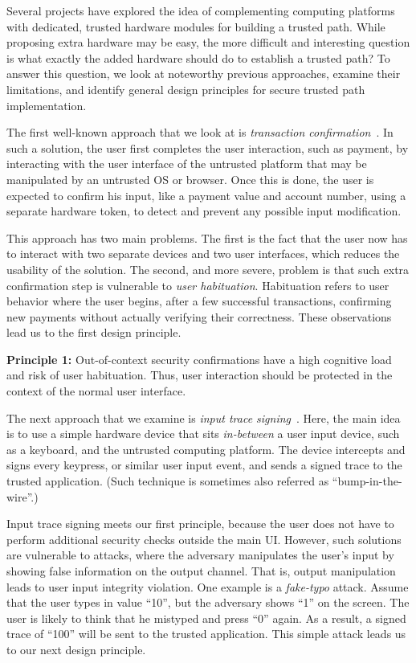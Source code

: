 Several projects have explored the idea of complementing computing platforms with dedicated, trusted hardware modules for building a trusted path. While proposing extra hardware may be easy, the more difficult and interesting question is what exactly the added hardware should do to establish a trusted path? To answer this question, we look at noteworthy previous approaches, examine their limitations, and identify general design principles for secure trusted path implementation.
    
The first well-known approach that we look at is \emph{transaction confirmation}~\cite{filyanov2011uni}. In such a solution, the user first completes the user interaction, such as payment, by interacting with the user interface of the untrusted platform that may be manipulated by an untrusted OS or browser. Once this is done, the user is expected to confirm his input, like a payment value and account number, using a separate hardware token, to detect and prevent any possible input modification.

This approach has two main problems. The first is the fact that the user now has to interact with two separate devices and two user interfaces, which reduces the usability of the solution. The second, and more severe, problem is that such extra confirmation step is vulnerable to \emph{user habituation}. Habituation refers to user behavior where the user begins, after a few successful transactions, confirming new payments without actually verifying their correctness. These observations lead us to the first design principle.  

\begin{tcolorbox}
\textbf{Principle 1:} Out-of-context security confirmations have a high cognitive load and risk of user habituation. Thus, user interaction should be protected in the context of the normal user interface.
\end{tcolorbox}

The next approach that we examine is \emph{input trace signing}~\cite{IntegriKey}. Here, the main idea is to use a simple hardware device that sits \emph{in-between} a user input device, such as a keyboard, and the untrusted computing platform. The device intercepts and signs every keypress, or similar user input event, and sends a signed trace to the trusted application. (Such technique is sometimes also referred as ``bump-in-the-wire''.)%

Input trace signing meets our first principle, because the user does not have to perform additional security checks outside the main UI. However, such solutions are vulnerable to attacks, where the adversary manipulates the user's input by showing false information on the output channel. That is, output manipulation leads to user input integrity violation. One example is a \emph{fake-typo} attack. Assume that the user types in value ``10'', but the adversary shows ``1'' on the screen. The user is likely to think that he mistyped and press ``0'' again. As a result, a signed trace of ``100'' will be sent to the trusted application. This simple attack leads us to our next design principle.


